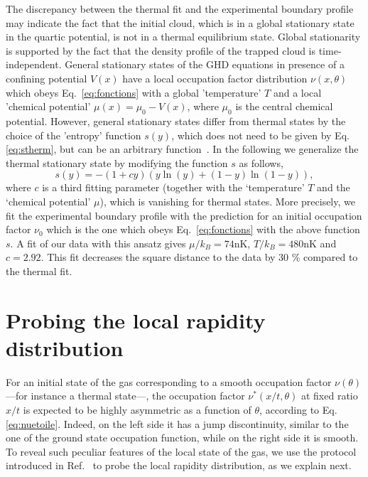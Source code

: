 The discrepancy between the thermal fit and the experimental boundary profile may 
indicate the fact that the initial cloud, which is in a global stationary state in the quartic potential, is not in a thermal equilibrium state.
Global stationarity is supported by the fact that the density profile of the trapped cloud is time-independent. 
General stationary states of the GHD equations in presence of a confining potential $V(x)$ have a local occupation 
factor distribution $\nu(x,\theta)$ which obeys Eq.~\eqref{eq:fonctions} with a global 
'temperature' $T$ and a local 'chemical potential' $\mu(x)=\mu_0 -V(x)$, where $\mu_0$ is the central chemical potential. However, general stationary states differ from thermal states by the choice of the 'entropy' function $s(y)$, which does not need to be given by  Eq.\eqref{eq:stherm}, but can be an arbitrary function~\cite{Bulchandani23}. In the following %
we generalize the 
thermal stationary state by modifying the function $s$ as follows,
\begin{equation}
    s(y)=  -(1+cy)\left( y\ln(y) +(1-y)\ln(1-y) \right ) ,
    \label{eq:s}
\end{equation}
where $c$ is a third fitting parameter (together with the `temperature' $T$ and the `chemical potential' $\mu$), which is vanishing 
for thermal states. More precisely, we fit the experimental boundary profile %
with the prediction for 
an initial  occupation factor $\nu_0$ which is the one which obeys Eq.~\eqref{eq:fonctions} with the above function $s$.
A fit of our data with this ansatz gives $\mu/k_B=74$nK, $T/k_B=480$nK and 
$c=2.92$. This fit decreases the square distance
to the data by  $30$ \% compared to the thermal fit.



\section{Probing the local rapidity distribution}
\label{sec:local}

For an initial state of the gas corresponding to a smooth occupation factor $\nu(\theta)$ ---for instance a thermal state---, the occupation factor  $\nu^*(x/t,\theta)$ at fixed ratio $x/t$ is expected to be highly asymmetric as a function of $\theta$, according to Eq.\eqref{eq:nuetoile}. Indeed, on the left side it has a jump discontinuity, similar to the one of the ground state occupation function, while on the right side it is smooth. To reveal such peculiar features of the local state of the gas, we use the protocol introduced in Ref.~\cite{dubois_probing_2024} to probe the local rapidity distribution, as we explain next.
		
